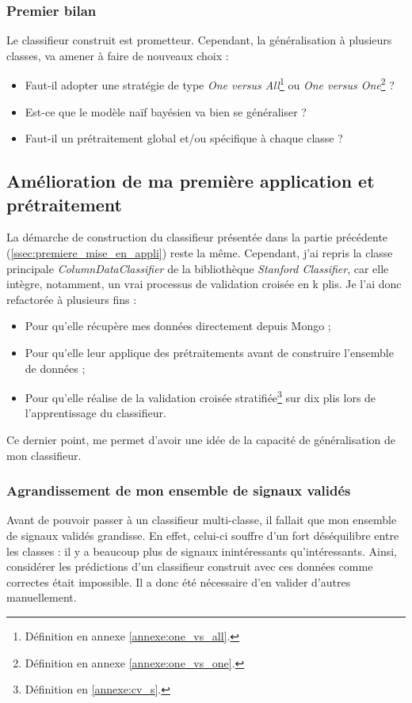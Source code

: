             \subsubsection{Premier bilan}
                Le classifieur construit est prometteur. Cependant, la généralisation à plusieurs classes, va amener à faire de nouveaux choix :
                \begin{itemize}
                    \item Faut-il adopter une stratégie de type \textit{One versus All}\footnote{Définition en annexe \ref{annexe:one_vs_all}.} ou \textit{One versus One}\footnote{Définition en annexe \ref{annexe:one_vs_one}.} ?
                    \item Est-ce que le modèle naïf bayésien va bien se généraliser ?
                    \item Faut-il un prétraitement global et/ou spécifique à chaque classe ?
                \end{itemize}

        \subsection{Amélioration de ma première application et prétraitement}
            La démarche de construction du classifieur présentée dans la partie précédente (\ref{ssec:premiere_mise_en_appli}) reste la même. Cependant, j'ai repris la classe principale \textit{ColumnDataClassifier} de la bibliothèque \textit{Stanford Classifier}, car elle intègre, notamment, un vrai processus de validation croisée en k plis. Je l'ai donc refactorée à plusieurs fins :
            \begin{itemize}
                \item Pour qu'elle récupère mes données directement depuis Mongo ;
                \item Pour qu'elle leur applique des prétraitements avant de construire l'ensemble de données ;
                \item Pour qu'elle réalise de la validation croisée stratifiée\footnote{Définition en \ref{annexe:cv_s}.} sur dix plis lors de l'apprentissage du classifieur.
            \end{itemize}
            Ce dernier point, me permet d'avoir une idée de la capacité de généralisation de mon classifieur.
            \subsubsection{Agrandissement de mon ensemble de signaux validés}
                Avant de pouvoir passer à un classifieur multi-classe, il fallait que mon ensemble de signaux validés grandisse. En effet, celui-ci souffre d'un fort déséquilibre entre les classes : il y a beaucoup plus de signaux inintéressants qu'intéressants. Ainsi, considérer les prédictions d'un classifieur construit avec ces données comme correctes était impossible. Il a donc été nécessaire d'en valider d'autres manuellement.\\

